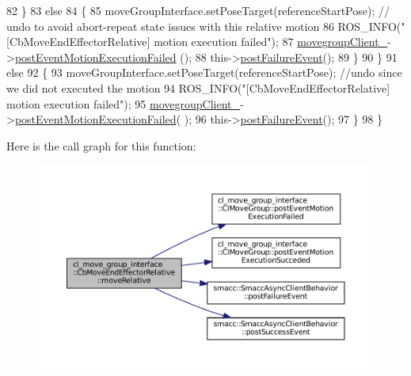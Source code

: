 \begin{DoxyCode}
82             \}
83             \textcolor{keywordflow}{else}
84             \{
85                 moveGroupInterface.setPoseTarget(referenceStartPose); \textcolor{comment}{// undo to avoid abort-repeat state
       issues with this relative motion}
86                 ROS\_INFO(\textcolor{stringliteral}{"[CbMoveEndEffectorRelative] motion execution failed"});
87                 \hyperlink{classcl__move__group__interface_1_1CbMoveEndEffectorRelative_ae742e6382bfb47fd9e1458bd6c8d3255}{movegroupClient\_}->\hyperlink{classcl__move__group__interface_1_1ClMoveGroup_a39dc3871d29b2af1ab739057f6ca6daa}{postEventMotionExecutionFailed}
      ();
88                 this->\hyperlink{classsmacc_1_1SmaccAsyncClientBehavior_af6fa358cb1ab5ed16791a201f59260e0}{postFailureEvent}();
89             \}
90         \}
91         \textcolor{keywordflow}{else}
92         \{
93             moveGroupInterface.setPoseTarget(referenceStartPose); \textcolor{comment}{//undo since we did not executed the
       motion}
94             ROS\_INFO(\textcolor{stringliteral}{"[CbMoveEndEffectorRelative] motion execution failed"});
95             \hyperlink{classcl__move__group__interface_1_1CbMoveEndEffectorRelative_ae742e6382bfb47fd9e1458bd6c8d3255}{movegroupClient\_}->\hyperlink{classcl__move__group__interface_1_1ClMoveGroup_a39dc3871d29b2af1ab739057f6ca6daa}{postEventMotionExecutionFailed}(
      );
96             this->\hyperlink{classsmacc_1_1SmaccAsyncClientBehavior_af6fa358cb1ab5ed16791a201f59260e0}{postFailureEvent}();
97         \}
98     \}
\end{DoxyCode}
Here is the call graph for this function\+:
\nopagebreak
\begin{figure}[H]
\begin{center}
\leavevmode
\includegraphics[width=350pt]{classcl__move__group__interface_1_1CbMoveEndEffectorRelative_ab9498fefa83f46b974ce5b13df7dbd16_cgraph}
\end{center}
\end{figure}
